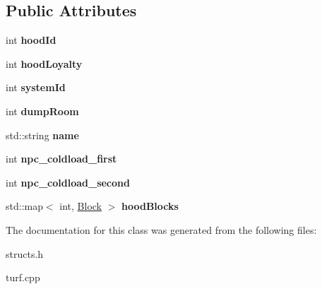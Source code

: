 \subsection*{Public Attributes}
\begin{DoxyCompactItemize}
\item 
\hypertarget{classNeighbourhood_a53602ff6f2061754528a29a44a579349}{int {\bfseries hood\-Id}}\label{classNeighbourhood_a53602ff6f2061754528a29a44a579349}

\item 
\hypertarget{classNeighbourhood_ad053336c8ee1f8c76a85209736aa8623}{int {\bfseries hood\-Loyalty}}\label{classNeighbourhood_ad053336c8ee1f8c76a85209736aa8623}

\item 
\hypertarget{classNeighbourhood_aace0c7358a67b0ba20a34cdfdc82571b}{int {\bfseries system\-Id}}\label{classNeighbourhood_aace0c7358a67b0ba20a34cdfdc82571b}

\item 
\hypertarget{classNeighbourhood_a10e20b14e890c7babb413585fa197bd2}{int {\bfseries dump\-Room}}\label{classNeighbourhood_a10e20b14e890c7babb413585fa197bd2}

\item 
\hypertarget{classNeighbourhood_a82bbd15ea0bdccee88d398070b707a04}{std\-::string {\bfseries name}}\label{classNeighbourhood_a82bbd15ea0bdccee88d398070b707a04}

\item 
\hypertarget{classNeighbourhood_a7babc46bba2f997a9fd577d273bbd94f}{int {\bfseries npc\-\_\-coldload\-\_\-first}}\label{classNeighbourhood_a7babc46bba2f997a9fd577d273bbd94f}

\item 
\hypertarget{classNeighbourhood_a555736237cc2685a9aa2c16c707b8816}{int {\bfseries npc\-\_\-coldload\-\_\-second}}\label{classNeighbourhood_a555736237cc2685a9aa2c16c707b8816}

\item 
\hypertarget{classNeighbourhood_aa75a3f4a3a1adb513bfef041f900ad5b}{std\-::map$<$ int, \hyperlink{classBlock}{Block} $>$ {\bfseries hood\-Blocks}}\label{classNeighbourhood_aa75a3f4a3a1adb513bfef041f900ad5b}

\end{DoxyCompactItemize}


The documentation for this class was generated from the following files\-:\begin{DoxyCompactItemize}
\item 
structs.\-h\item 
turf.\-cpp\end{DoxyCompactItemize}
